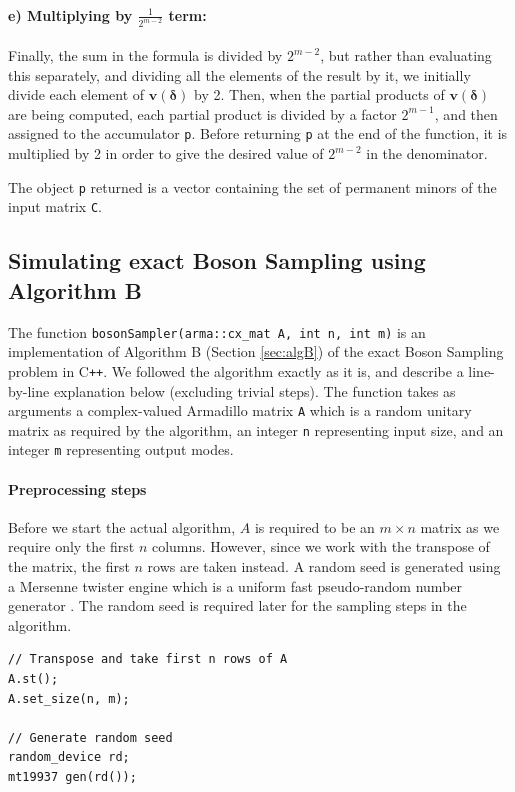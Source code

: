 \documentclass[ %
                    author={Manan Vaswani},
                supervisor={Dr. Raphael Clifford},
                    degree={MEng},
                     title={A multi-core CPU implementation of the classical Boson Sampling algorithm},
                  subtitle={},
                      type={},
                      year={2019} ]{dissertation}
\theoremstyle{plain}
\theoremstyle{definition}
\begin{document}
\paragraph{e) Multiplying by $\frac{1}{2^{m-2}}$ term:} Finally, the sum in the formula is divided by $2^{m-2}$, but rather than evaluating this separately, and dividing all the elements of the result by it, we initially divide each element of $\mathbf{v}(\mathbf{\delta})$ by 2. Then, when the partial products of $\mathbf{v}(\mathbf{\delta})$ are being computed, each partial product is divided by a factor $2^{m-1}$, and then assigned to the accumulator \texttt{p}. Before returning  \texttt{p} at the end of the function, it is multiplied by 2 in order to give the desired value of $2^{m-2}$ in the denominator.

The object \texttt{p} returned is a vector containing the set of permanent minors of the input matrix \texttt{C}.

\subsection{Simulating exact Boson Sampling using Algorithm B}
The function \texttt{bosonSampler(arma::cx_mat A, int n, int m)} is an implementation of Algorithm B (Section \ref{sec:algB}) of the exact Boson Sampling problem in C\texttt{++}. We followed the algorithm exactly as it is, and describe a line-by-line explanation below (excluding trivial steps). The function takes as arguments a complex-valued Armadillo matrix \texttt{A} which is a random unitary matrix as required by the algorithm, an integer \texttt{n} representing input size, and an integer \texttt{m} representing output modes.
\paragraph{Preprocessing steps} Before we start the actual algorithm, $A$ is required to be an $m \times n$ matrix as we require only the first $n$ columns. However, since we work with the transpose of the matrix, the first $n$ rows are taken instead. A random seed is generated using a Mersenne twister engine which is a uniform fast pseudo-random number generator \cite{matsumoto1998}. The random seed is required later for the sampling steps in the algorithm.
\begin{verbatim}
// Transpose and take first n rows of A
A.st();
A.set_size(n, m);

// Generate random seed
random_device rd;
mt19937 gen(rd());
\end{verbatim}
\end{document}
